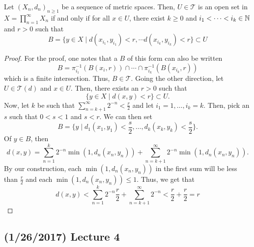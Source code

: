 \documentclass[11pt,leqno,oneside]{amsbook}
\numberwithin{thm}{section}
\newcommand{\Top}{\mathcal{T}} %
\begin{document}
\begin{prop}
  Let $(X_n,d_n)_{n \geq 1}$ be a sequence of metric spaces. Then, $U
  \in \Top$ is an open set in $X = \prod_{n=1}^\infty X_n$ if and only
  if for all $x \in U$, there exist $k \geq 0$ and $i_1 < \cdots <
  i_k \in {\mathbb N}$ and $r > 0$ such that \[
    B = \{y \in X \mid d(x_{i_1},y_{i_1}) < r, \cdots
    d(x_{i_k},y_{i_k}) < r\} \subset U
  \]
\end{prop}
\begin{proof}
  For the proof, one notes that a $B$ of this form can also be written \[
    B = \pi_{i_1}^{-1}(B(x_i,r)) \cap \cdots \cap \pi_{i_k}^{-1}(B(x_{i_k},r))
  \]
  which is a finite intersection. Thus, $B \in \Top$. Going the other
  direction, let $U \in \Top(d)$ and $x \in U$. Then, there exists an
  $r > 0$ such that \[
    \{y \in X \mid d(x,y) < r\} \subset U.
  \]
  Now, let $k$ be such that $\sum_{n=k+1}^\infty 2^{-n} <
  \frac{r}{2}$ and let $i_1 = 1, \ldots, i_k = k$. Then, pick an $s$
  such that $0 < s < 1$ and $s < r$. We can then set \[
    B = \{y \mid d_1(x_1,y_1) < \frac{s}{2}, \ldots, d_k(x_k,y_k) < \frac{s}{2} \}.
  \]
  Of $y \in B$, then \[
    d(x,y) = \sum_{n=1}^k 2^{-n} \min(1,d_n(x_n,y_n)) +
    \sum_{n=k+1}^\infty 2^{-n} \min(1,d_n(x_n,y_n)).
  \]
  By our construction, each $\min(1,d_n(x_n,y_n))$ in the first sum will be less than
  $\frac{r}{2}$ and each $\min(1,d_n(x_n,y_n)) \leq 1$. Thus, we get
  that \[
    d(x,y) < \sum_{n=1}^k 2^{-n} \frac{r}{2} + \sum_{n=k+1}^\infty
    2^{-n} < \frac{r}{2} + \frac{r}{2} = r
  \]
\end{proof}
\subsection*{(1/26/2017) Lecture 4}
\end{document}
